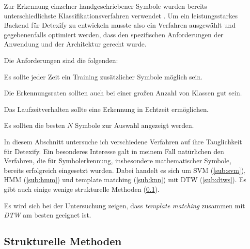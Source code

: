 \label{sec:klassifizierung}

Zur Erkennung einzelner handgeschriebener Symbole wurden bereits unterschiedlichste Klassifikationsverfahren verwendet \cite{Plamondon:2000p10303}. Um ein leistungsstarkes Backend für Detexify zu entwickeln musste also ein Verfahren ausgewählt und gegebenenfalls optimiert werden, dass den spezifischen Anforderungen der Anwendung und der Architektur gerecht wurde.

Die Anforderungen sind die folgenden:
\begin{description}
  \label{desc:anforderungen}
  \item[Adaptionsfähigkeit] Es sollte jeder Zeit ein Training zusätzlicher Symbole möglich sein.
  \item[Skalierbarkeit] Die Erkennungsraten sollten auch bei einer großen Anzahl von Klassen gut sein.
  \item[Laufzeitverhalten] Das Laufzeitverhalten sollte eine Erkennung in Echtzeit ermöglichen.
  \item[Interaktivität] Es sollten die besten $N$ Symbole zur Auswahl angezeigt werden.
\end{description}

In diesem Abschnitt untersuche ich verschiedene Verfahren auf ihre Tauglichkeit für Detexify. Ein besonderes Interesse galt in meinem Fall natürlichen den Verfahren, die für Symbolerkennung, insbesondere mathematischer Symbole, bereits erfolgreich eingesetzt wurden. Dabei handelt es sich um \ac{SVM} (\ref{sub:svm}), \ac{HMM} (\ref{sub:hmm}) und template matching (\ref{sub:knn}) mit \ac{DTW} (\ref{sub:dtws}). Es gibt auch einige wenige strukturelle Methoden (\ref{sub:strukturelle_methoden}).

Es wird sich bei der Untersuchung zeigen, dass \emph{template matching} zusammen mit \emph{\ac{DTW}} am besten geeignet ist.

\subsection{Strukturelle Methoden} \label{sub:strukturelle_methoden}

